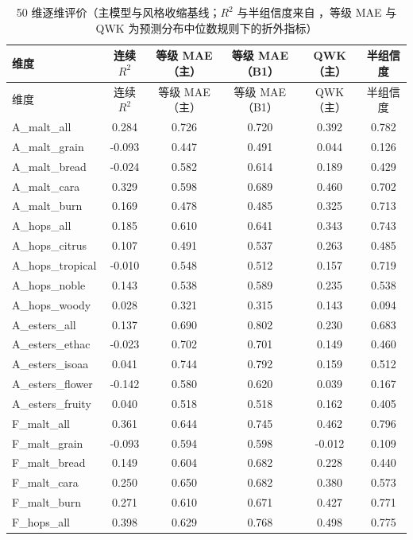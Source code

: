 \begin{longtable}{lccccc}
\caption{50 维逐维评价（主模型与风格收缩基线；$R^2$ 与半组信度来自 ，等级 MAE 与 QWK 为预测分布中位数规则下的折外指标）}
\label{tab:appb_dim}\\
\toprule
维度 & 连续 $R^2$ & 等级 MAE（主） & 等级 MAE（B1） & QWK（主） & 半组信度 \\
\midrule
\endfirsthead
\toprule
维度 & 连续 $R^2$ & 等级 MAE（主） & 等级 MAE（B1） & QWK（主） & 半组信度 \\
\midrule
\endhead
\bottomrule
\endfoot
A\_malt\_all & 0.284 & 0.726 & 0.720 & 0.392 & 0.782 \\
A\_malt\_grain & -0.093 & 0.447 & 0.491 & 0.044 & 0.126 \\
A\_malt\_bread & -0.024 & 0.582 & 0.614 & 0.189 & 0.429 \\
A\_malt\_cara & 0.329 & 0.598 & 0.689 & 0.460 & 0.702 \\
A\_malt\_burn & 0.169 & 0.478 & 0.485 & 0.325 & 0.713 \\
A\_hops\_all & 0.185 & 0.610 & 0.641 & 0.343 & 0.743 \\
A\_hops\_citrus & 0.107 & 0.491 & 0.537 & 0.263 & 0.485 \\
A\_hops\_tropical & -0.010 & 0.548 & 0.512 & 0.157 & 0.719 \\
A\_hops\_noble & 0.143 & 0.538 & 0.589 & 0.235 & 0.538 \\
A\_hops\_woody & 0.028 & 0.321 & 0.315 & 0.143 & 0.094 \\
A\_esters\_all & 0.137 & 0.690 & 0.802 & 0.230 & 0.683 \\
A\_esters\_ethac & -0.023 & 0.702 & 0.701 & 0.149 & 0.460 \\
A\_esters\_isoaa & 0.041 & 0.744 & 0.792 & 0.159 & 0.512 \\
A\_esters\_flower & -0.142 & 0.580 & 0.620 & 0.039 & 0.167 \\
A\_esters\_fruity & 0.040 & 0.518 & 0.518 & 0.162 & 0.405 \\
F\_malt\_all & 0.361 & 0.644 & 0.745 & 0.462 & 0.796 \\
F\_malt\_grain & -0.093 & 0.594 & 0.598 & -0.012 & 0.109 \\
F\_malt\_bread & 0.149 & 0.604 & 0.682 & 0.228 & 0.440 \\
F\_malt\_cara & 0.250 & 0.650 & 0.682 & 0.380 & 0.573 \\
F\_malt\_burn & 0.271 & 0.610 & 0.671 & 0.427 & 0.771 \\
F\_hops\_all & 0.398 & 0.629 & 0.768 & 0.498 & 0.775 \\

\end{longtable}
